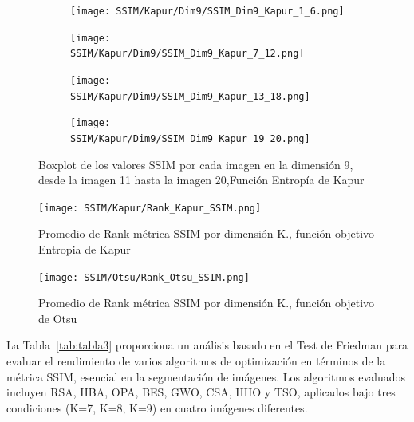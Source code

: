 \documentclass[conference]{IEEEtran}
\begin{document}
\begin{figure}
	\centering
	
	\begin{subfigure}{0.4\textwidth}
		\texttt{[image: SSIM/Kapur/Dim9/SSIM\_Dim9\_Kapur\_1\_6.png]}
	\end{subfigure}
	
	\begin{subfigure}{0.4\textwidth}
		\texttt{[image: SSIM/Kapur/Dim9/SSIM\_Dim9\_Kapur\_7\_12.png]}
	\end{subfigure}
	\begin{subfigure}{0.4\textwidth}
		\texttt{[image: SSIM/Kapur/Dim9/SSIM\_Dim9\_Kapur\_13\_18.png]}
	\end{subfigure}   
	\begin{subfigure}{0.4\textwidth}
		\texttt{[image: SSIM/Kapur/Dim9/SSIM\_Dim9\_Kapur\_19\_20.png]}
		\vspace{-120pt} %
	\end{subfigure}
	\caption{Boxplot de los valores SSIM por cada imagen en la dimensión 9, desde la imagen 11 hasta la imagen 20,Función Entropía de Kapur}
	\label{fig:imagenes}    
\end{figure}

\begin{figure}[!htb]
	\centering
	\texttt{[image: SSIM/Kapur/Rank\_Kapur\_SSIM.png]}
	\caption{Promedio de Rank métrica SSIM por dimensión K., función objetivo Entropia de Kapur}
	\label{fig:fig511}
\end{figure}

\begin{figure}[!htb]
	\centering
	\texttt{[image: SSIM/Otsu/Rank\_Otsu\_SSIM.png]}
	\caption{Promedio de Rank métrica SSIM por dimensión K., función objetivo de Otsu}
\end{figure}



\noindent La Tabla~\ref{tab:tabla3} proporciona un análisis basado en el Test de Friedman para evaluar el rendimiento de varios algoritmos de optimización en términos de la métrica SSIM, esencial en la segmentación de imágenes. Los algoritmos evaluados incluyen RSA, HBA, OPA, BES, GWO, CSA, HHO y TSO, aplicados bajo tres condiciones (K=7, K=8, K=9) en cuatro imágenes diferentes. 
\end{document}
